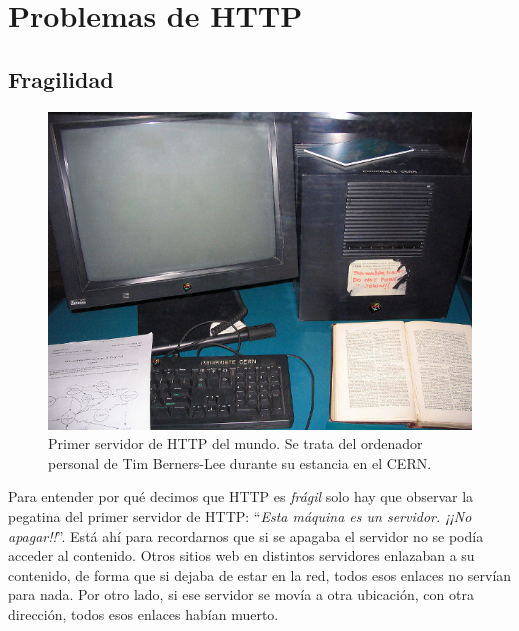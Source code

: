 \documentclass[12pt]{article} %
\begin{document}
\newpage



\section{Problemas de HTTP} %
\label{sec:problemas_de_http}

\subsection{Fragilidad} %
\label{sub:fragilidad}

\begin{figure}[h]
\includegraphics[width=\textwidth]{first-web-server}
\caption{Primer servidor de HTTP del mundo. Se trata del ordenador personal de Tim Berners-Lee durante su estancia en el CERN.}
\end{figure}

Para entender por qué decimos que HTTP es \textit{frágil} solo hay que observar la pegatina del primer servidor de HTTP: ``\textit{Esta máquina es un servidor. ¡¡No apagar!!}''. Está ahí para recordarnos que si se apagaba el servidor no se podía acceder al contenido. Otros sitios web en distintos servidores enlazaban a su contenido, de forma que si dejaba de estar en la red, todos esos enlaces no servían para nada. Por otro lado, si ese servidor se movía a otra ubicación, con otra dirección, todos esos enlaces habían muerto.
\end{document}
